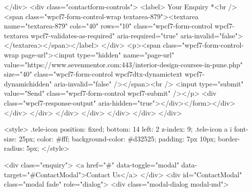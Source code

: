 {{{{{{{</div>
<div class="contactform-controls">
<label> Your Enquiry *<br />
<span class="wpcf7-form-control-wrap textarea-879"><textarea name="textarea-879" cols="40" rows="10" class="wpcf7-form-control wpcf7-textarea wpcf7-validates-as-required" aria-required="true" aria-invalid="false"></textarea></span></label>
</div>
<p><span class="wpcf7-form-control-wrap page-url"><input type="hidden" name="page-url" value="https://www.sevenmentor.com:443/interior-design-courses-in-pune.php" size="40" class="wpcf7-form-control wpcf7dtx-dynamictext wpcf7-dynamichidden" aria-invalid="false" /></span><br />
<input type="submit" value="Send" class="wpcf7-form-control wpcf7-submit" /></p>
<div class="wpcf7-response-output" aria-hidden="true"></div></form></div>
</div>
</div>
</div>
</div>
</div>
</div>
</div>

<style>	
.tele-icon {
    position: fixed;
    bottom: 14%
    left: 2%
    z-index: 9;
}
.tele-icon a i {
    font-size: 25px;
    color: #fff;
    background-color: #d32525;
    padding: 7px 10px;
    border-radius: 5px;
}
</style>

<div class="enquiry">
<a href="#" data-toggle="modal" data-target="#ContactModal">Contact Us</a>
</div>
<div id="ContactModal" class="modal fade" role="dialog">
<div class="modal-dialog modal-md">

}}}}}}}
